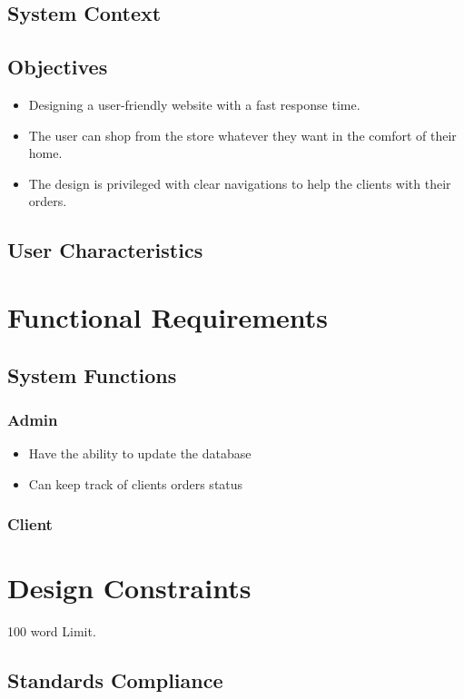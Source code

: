 \documentclass[12pt]{article}
\begin{document}
\subsection{System Context}

\subsection{Objectives}
\begin{itemize}
 \item Designing a user-friendly website with a fast response time.
 \item The user can shop from the store whatever they want in the comfort of their home.
 \item The design is privileged with clear navigations to help the clients with their orders.
\end{itemize}

\subsection{ User Characteristics}



\pagebreak 
\section{Functional Requirements}
\subsection{System Functions}\label{System Functions}
\subsubsection{Admin}
\begin{itemize}
\item Have the ability to update the database
\item Can keep track of clients orders status
\end{itemize}
\subsubsection{Client}

\section{Design Constraints}
100 word Limit.

\subsection{ Standards Compliance}
\end{document}
